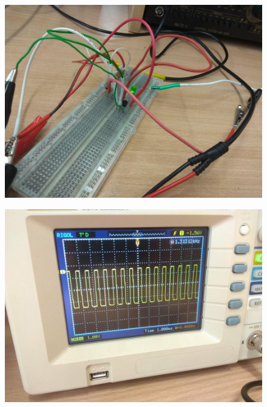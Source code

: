 \documentclass[polish,polish,a4paper]{article}
\begin{document}
\begin{figure}[H]
	\centering
	\includegraphics[scale=0.3]{diodadlamalego.jpg}
\end{figure}

\begin{figure}[H]
	\centering
	\includegraphics[scale=0.3]{duze.jpg}
\end{figure}
\end{document}
